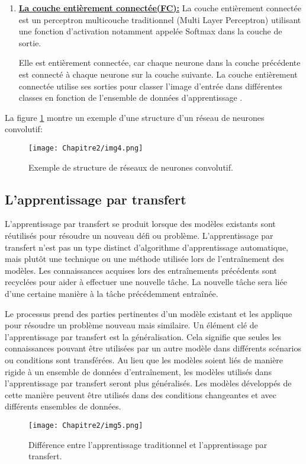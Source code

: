 \begin{enumerate}
\item \underline{\textbf{La couche entièrement connectée(FC):}}
La couche entièrement connectée est un perceptron multicouche traditionnel (Multi Layer Perceptron) utilisant une fonction d'activation notamment appelée Softmax dans la couche de sortie. 

Elle est entièrement connectée, car chaque neurone dans la couche précédente est connecté à chaque neurone sur la couche suivante. La couche entièrement connectée utilise ses sorties pour classer l'image d'entrée dans différentes classes en fonction de l'ensemble de données d'apprentissage \cite{CNN2015}.  
\end{enumerate}     
La figure \ref{img4} montre un exemple d'une structure d'un réseau de neurones convolutif:
     \begin{figure}[H]
          \centering
          \texttt{[image: Chapitre2/img4.png]}
          \caption{Exemple de structure de réseaux de neurones convolutif.}
          \label{img4}
          \end{figure}

     \subsection{L'apprentissage par transfert} 
     L'apprentissage par transfert se produit lorsque des modèles existants sont réutilisés pour résoudre un nouveau défi ou problème. L'apprentissage par transfert n'est pas un type distinct d'algorithme d'apprentissage automatique, mais plutôt une technique ou une méthode utilisée lors de l'entraînement des modèles. Les connaissances acquises lors des entraînements précédents sont recyclées pour aider à effectuer une nouvelle tâche. La nouvelle tâche sera liée d'une certaine manière à la tâche précédemment entraînée.

     Le processus prend des parties pertinentes d'un modèle existant et les applique pour résoudre un problème nouveau mais similaire. Un élément clé de l'apprentissage par transfert est la généralisation. Cela signifie que seules les connaissances pouvant être utilisées par un autre modèle dans différents scénarios ou conditions sont transférées. Au lieu que les modèles soient liés de manière rigide à un ensemble de données d'entraînement, les modèles utilisés dans l'apprentissage par transfert seront plus généralisés. Les modèles développés de cette manière peuvent être utilisés dans des conditions changeantes et avec différents ensembles de données.
     \begin{figure}[H]
          \centering
          \texttt{[image: Chapitre2/img5.png]}
          \caption{Différence entre l'apprentissage traditionnel et l'apprentissage par transfert.}
          \label{img5}
          \end{figure}

